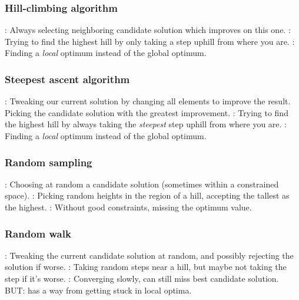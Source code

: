 \documentclass[11pt]{beamer}
\begin{document}
\begin{frame}[fragile]
  \frametitle{Hill-climbing algorithm}
  \Enlarge

  \begin{enumerate}
  :  Always selecting neighboring candidate solution which improves on this one. \pause
  :  Trying to find the highest hill by only taking a step uphill from where you are. \pause
  :  Finding a \emph{local} optimum instead of the global optimum.
  \end{enumerate}
\end{frame}

\begin{frame}[fragile]
  \frametitle{Steepest ascent algorithm}
  \Enlarge

  \begin{enumerate}
  :  Tweaking our current solution by changing all elements to improve the result.  Picking the candidate solution with the greatest improvement. \pause
  :  Trying to find the highest hill by always taking the \emph{steepest} step uphill from where you are. \pause
  :  Finding a \emph{local} optimum instead of the global optimum.
  \end{enumerate}
\end{frame}

\begin{frame}[fragile]
  \frametitle{Random sampling}
  \Enlarge

  \begin{enumerate}
  :  Choosing at random a candidate solution (sometimes within a constrained space). \pause
  :  Picking random heights in the region of a hill, accepting the tallest as the highest. \pause
  :  Without good constraints, missing the optimum value.
  \end{enumerate}
\end{frame}

\begin{frame}[fragile]
  \frametitle{Random walk}
  \Enlarge

  \begin{enumerate}
  :  Tweaking the current candidate solution at random, and possibly rejecting the solution if worse. \pause
  :  Taking random steps near a hill, but maybe not taking the step if it's worse. \pause
  :  Converging slowly, can still miss best candidate solution.  BUT:  has a way from getting stuck in local optima.
  \end{enumerate}
\end{frame}
\end{document}
